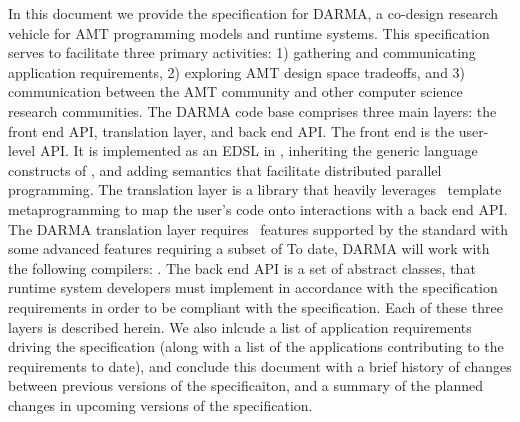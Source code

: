 
In this document we provide the specification for DARMA,
a co-design research vehicle for \gls{AMT} programming models and runtime
systems.  This specification serves to facilitate three primary activities: 
1) gathering and communicating application requirements, 2) exploring AMT
design space tradeoffs, and 3) communication between the AMT community and
other computer science research communities.
The DARMA code base comprises three main layers: the \gls{front end} \gls{API},
\gls{translation layer}, and
\gls{back end} \gls{API}.  The \gls{front end} is the user-level \gls{API}.  It
is implemented as an \gls{EDSL} in \CC,  inheriting the generic language
constructs of \CC, and adding \gls{semantics} that facilitate distributed
parallel programming.
The \gls{translation layer} is a library that heavily leverages \CC\ \gls{template metaprogramming} 
to map the user's code onto interactions with a \gls{back end} \gls{API}.  
The DARMA \gls{translation layer} requires \CC\ features supported by the  standard with some advanced features requiring a subset of 
To date, DARMA will work with the following compilers: .
The \gls{back end} \gls{API} is a set of abstract classes, that runtime system
developers must implement in accordance with the specification requirements in
order to be compliant with the specification.
Each of these three layers is described herein. We also inlcude a list of
application requirements driving the specification (along with a list of the
applications contributing to the requirements to date), and
conclude this document with
a brief history of changes between
previous versions of the specificaiton, and a summary of the planned changes 
in upcoming versions of the specification.

